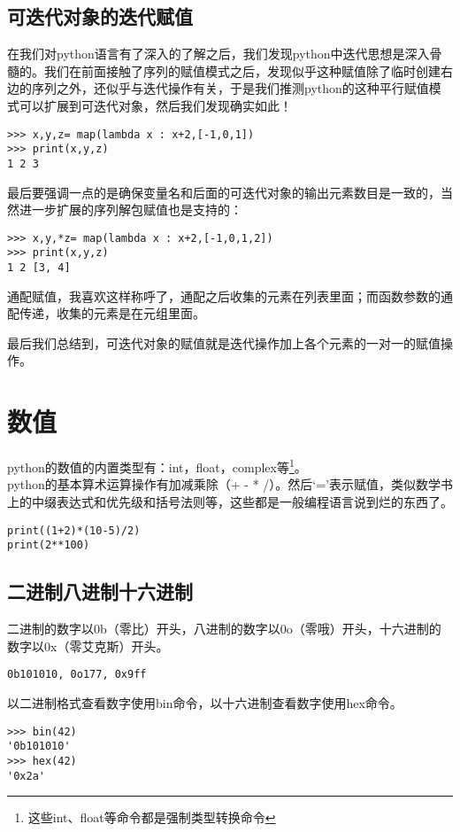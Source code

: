 \documentclass[12pt,oneside]{book}
\begin{document}
\begin{common-format}
\subsection{可迭代对象的迭代赋值}
在我们对python语言有了深入的了解之后，我们发现python中迭代思想是深入骨髓的。我们在前面接触了序列的赋值模式之后，发现似乎这种赋值除了临时创建右边的序列之外，还似乎与迭代操作有关，于是我们推测python的这种平行赋值模式可以扩展到可迭代对象，然后我们发现确实如此！
\begin{Verbatim}
>>> x,y,z= map(lambda x : x+2,[-1,0,1])
>>> print(x,y,z)
1 2 3
\end{Verbatim}

最后要强调一点的是确保变量名和后面的可迭代对象的输出元素数目是一致的，当然进一步扩展的序列解包赋值也是支持的：
\begin{Verbatim}
>>> x,y,*z= map(lambda x : x+2,[-1,0,1,2])
>>> print(x,y,z)
1 2 [3, 4]
\end{Verbatim}
通配赋值，我喜欢这样称呼了，通配之后收集的元素在列表里面；而函数参数的通配传递，收集的元素是在元组里面。

最后我们总结到，可迭代对象的赋值就是迭代操作加上各个元素的一对一的赋值操作。


\section{数值}
python的数值的内置类型有：int，float，complex等\footnote{这些int、float等命令都是强制类型转换命令}。\\python的基本算术运算操作有加减乘除（+ - * /）。然后‘=’表示赋值，类似数学书上的中缀表达式和优先级和括号法则等，这些都是一般编程语言说到烂的东西了。

\begin{Verbatim}
print((1+2)*(10-5)/2)
print(2**100)
\end{Verbatim}


\subsection{二进制八进制十六进制}
二进制的数字以0b（零比）开头，八进制的数字以0o（零哦）开头，十六进制的数字以0x（零艾克斯）开头。
\begin{Verbatim}
0b101010, 0o177, 0x9ff
\end{Verbatim}

以二进制格式查看数字使用bin命令，以十六进制查看数字使用hex命令。
\begin{Verbatim}
>>> bin(42)
'0b101010'
>>> hex(42)
'0x2a'
\end{Verbatim}


\end{common-format}
\end{document}
